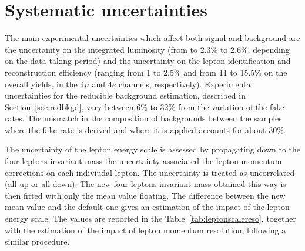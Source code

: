 \section{Systematic uncertainties}

The main experimental uncertainties which affect both signal and background are the uncertainty on the integrated luminosity
(from to 2.3\% to 2.6\%, depending on the data taking period) and the uncertainty on the lepton identification and reconstruction efficiency (ranging from 1 to 2.5\% and from 11 to 15.5\% on the overall yields, in the $4\mu$ and $4e$ channels, respectively). Experimental uncertainties for the reducible background estimation, 
described in Section~\ref{sec:redbkgd},
vary between 6\% to 32\% from the variation of the fake rates. The mismatch in the composition of backgrounds between the samples where the fake rate is derived and where it is applied accounts for about 30\%. %

The uncertainty of the lepton energy scale is assessed by propagating down to the four-leptons invariant mass the uncertainty associated the lepton momentum corrections on each indiviudal lepton. 
The uncertainty is treated as uncorrelated (all up or all down). The new four-leptons invariant mass obtained this way is then fitted with only the mean value floating.
The difference between the new mean value and the default one gives an estimation of the impact of the lepton energy scale. The values are reported in the Table~\ref{tab:leptonscalereso}, together with the estimation of the impact of lepton momentum resolution, following a similar procedure.



